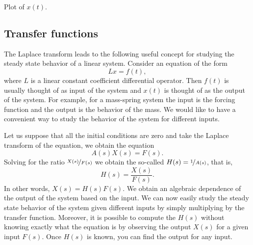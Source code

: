 \begin{example}
\begin{myfig}
\capstart
{}
\caption{Plot of $x(t)$.\label{lt:heavisideexfig}}
\end{myfig}
\end{example}

\subsection{Transfer functions}

The Laplace transform leads to the following useful concept for studying the
steady state behavior of a linear system.  Consider an equation of the
form
\begin{equation*}
L x = f(t) ,
\end{equation*}
where $L$ is a linear constant coefficient differential operator.
Then $f(t)$ is usually thought of as input of the system and $x(t)$ is
thought of as the output of the system.  For example, for a mass-spring
system the input is the forcing function and the output is the behavior of the
mass.  We would like to have a convenient way to study the behavior of
the system for different inputs.

Let us suppose that
all the initial conditions are zero and take the Laplace transform
of the equation, we obtain the equation
\begin{equation*}
A(s) X(s) = F(s) .
\end{equation*}
Solving for the ratio $\nicefrac{X(s)}{F(s)}$ we obtain the so-called
\emph{}
$H(s) = \nicefrac{1}{A(s)}$,
that is,
\begin{equation*}
H(s) = \frac{X(s)}{F(s)} .
\end{equation*}
In other words, $X(s) = H(s) F(s)$.  We obtain an algebraic dependence of
the output of the system based on the input.  We can now easily study the
steady state behavior of the system given different inputs by simply
multiplying by the transfer function.
Moreover, it is possible to compute the $H(s)$ without knowing exactly what
the equation is by observing the output $X(s)$ for a given input $F(s)$.
Once $H(s)$ is known, you can find the output for any input.

